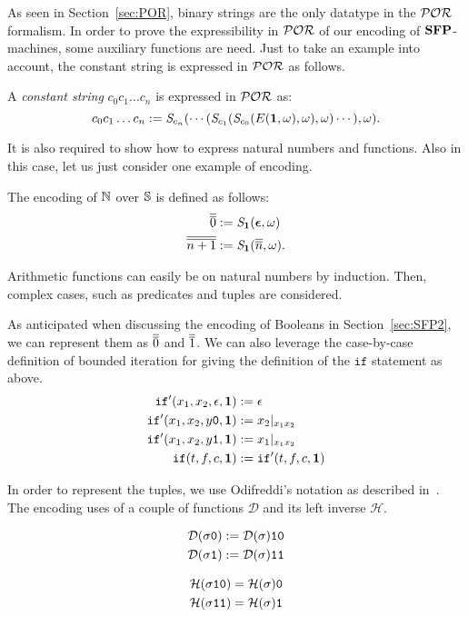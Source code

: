 As seen in Section~\ref{sec:POR},
binary strings
are the only datatype in the
$\mathcal{POR}$ formalism.
In order to prove the expressibility
in $\mathcal{POR}$
of our
encoding of $\mathbf{SFP}$-machines,
some auxiliary functions are
need.
Just to take an example into
account, the constant
string is expressed in $\mathcal{POR}$
as follows.


\begin{defn}
A \emph{constant string}
$c_0c_1\dots c_n$
is expressed in $\mathcal{POR}$ as:
$$
c_0c_1\dots c_n := \emph{S}_{c_n}(
\cdots(\emph{S}_{c_1}(\emph{S}_{c_0}(E(\mathbf{1},\omega),
\omega),\omega)\cdots),\omega).
$$
\end{defn}
%
%
\noindent
It is also required to show how
to express natural numbers
and functions.
Also in this case, let us just
consider one example of encoding.


\begin{defn}
The encoding of $\mathbb{N}$ over $\mathbb{S}$
is defined as follows:
\begin{align*}
\overline{\overline{0}} &:= \emph{S}_{\mathbf{1}}(\bm{\epsilon},\omega) \\
\overline{\overline{n+1}} &:= \emph{S}_ {\mathbf{1}}(\overline{\overline{n}},\omega).
\end{align*}
\end{defn}
%
%
\noindent
Arithmetic functions can easily be on natural numbers by induction.
Then, complex cases,
such as predicates
and tuples are considered.


As anticipated when discussing the encoding of Booleans in
Section~\ref{sec:SFP2}, we can represent them as $\overline{\overline{0}}$ and $\overline{\overline{1}}$.
%
We can also leverage the case-by-case definition of bounded iteration
for giving the definition of the $\mathtt{if}$ statement as above.
\begin{align*}
\mathtt{if}'(x_1, x_2, \epsilon, \mathbf{1})&:= \epsilon\\
\mathtt{if}'(x_1, x_2, y\mathtt{0}, \mathbf{1})&:= x_2|_{x_1x_2}\\
\mathtt{if}'(x_1, x_2, y\mathtt{1}, \mathbf{1})&:= x_1|_{x_1x_2}\\
\mathtt{if}(t, f, c, \mathbf{1}) &:= \mathtt{if}'(t, f, c, \mathbf{1})
\end{align*}

In order to represent the tuples, we use Odifreddi's notation as described in~\cite[p. 183]{Odifreddi}.
The encoding uses of a couple of functions $\mathcal D$
and its left inverse $\mathcal H$.

\begin{defn}

\begin{align*}
\mathcal D(\sigma\mathtt{0}) &:= \mathcal D(\sigma)\mathtt{1}\mathtt{0}\\
\mathcal D(\sigma\mathtt{1}) &:=  \mathcal D(\sigma)\mathtt{1}\mathtt{1}
\end{align*}

\begin{align*}
\mathcal H (\sigma \mathtt{1}\mathtt{0})&=\mathcal H(\sigma)\mathtt{0}\\
\mathcal H (\sigma \mathtt{1}\mathtt{1})&=\mathcal H(\sigma)\mathtt{1}\\
\end{align*}
\end{defn}

